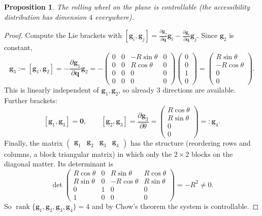 \documentclass[11pt,a4paper]{article}
\theoremstyle{definition}
\theoremstyle{plain}
\newtheorem{proposition}[definition]{Proposition}
\newcommand{\R}{\mathbb{R}}
\newcommand{\qv}{\bm{q}}
\DeclareMathOperator{\rank}{rank}
\begin{document}
\begin{proposition}\label{prop:rollwheel}
The rolling wheel on the plane is controllable (the accessibility distribution has dimension $4$ everywhere).
\end{proposition}
\begin{proof}
Compute the Lie brackets with $[\bm g_i,\bm g_j]=\frac{\partial\bm g_j}{\partial\qv}\bm g_i-\frac{\partial\bm g_i}{\partial\qv}\bm g_j$. Since $\bm g_2$ is constant,
\[
 \bm g_3:=[\bm g_1,\bm g_2]=-\frac{\partial\bm g_1}{\partial\qv}\bm g_2
 =-\begin{pmatrix}0&0&-R\sin\theta&0\\0&0&R\cos\theta&0\\0&0&0&0\\0&0&0&0\end{pmatrix}
 \begin{pmatrix}0\\0\\1\\0\end{pmatrix}=\begin{pmatrix}R\sin\theta\\-R\cos\theta\\0\\0\end{pmatrix}.
\]
This is linearly independent of $\bm g_1,\bm g_2$, so already $3$ directions are available. Further brackets:
\[
 [\bm g_1,\bm g_3]=\bm 0,\qquad [\bm g_2,\bm g_3]=\frac{\partial\bm g_3}{\partial\theta}=\begin{pmatrix}R\cos\theta\\R\sin\theta\\0\\0\end{pmatrix}=:\bm g_4 .
\]
Finally, the matrix $\begin{pmatrix}\bm g_1&\bm g_2&\bm g_3&\bm g_4\end{pmatrix}$ has the structure (reordering rows and columns, a block triangular matrix) in which only the $2\times2$ blocks on the diagonal matter. Its determinant is
\[
 \det\begin{pmatrix}R\cos\theta&0&R\sin\theta&R\cos\theta\\R\sin\theta&0&-R\cos\theta&R\sin\theta\\0&1&0&0\\1&0&0&0\end{pmatrix}=-R^2\neq0 .
\]
So $\rank\{\bm g_1,\bm g_2,\bm g_3,\bm g_4\}=4$ and by Chow's theorem the system is controllable.
\end{proof}
\end{document}
